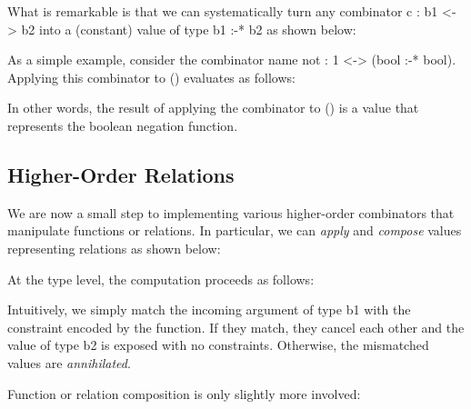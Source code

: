 \documentclass{llncs}
\begin{document}

What is remarkable is that we can systematically turn any combinator
{{c : b1 <-> b2}} into a (constant) value of type {{b1 :-* b2}} as
shown below:


As a simple example, consider the combinator 
{{name not : 1 <-> (bool :-* bool)}}. Applying this 
combinator to {{ () }} evaluates as follows:


\noindent In other words, the result of applying the combinator to {{ () }}
is a value that represents the boolean negation function. 

\subsection{Higher-Order Relations}

We are now a small step to implementing various higher-order
combinators that manipulate functions or relations. In particular, we
can \emph{apply} and \emph{compose} values representing relations as
shown below:


\noindent At the type level, the computation proceeds as follows:

\noindent Intuitively, we simply match the incoming argument of type {{b1}} with
the constraint encoded by the function. If they match, they cancel
each other and the value of type {{b2}} is exposed with no
constraints. Otherwise, the mismatched values are \emph{annihilated}.

Function or relation composition is only slightly more involved:

\end{document}
